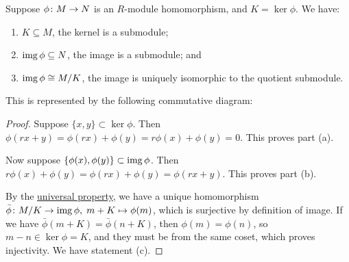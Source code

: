 \begin{theorem}\label{thm:iso-1-mod}
    Suppose \(\phi\colon M\to N\) is an \(R\)-module homomorphism,
    and \(K = \ker\phi\). We have:
    \begin{enumerate}[label={(\alph*)}, itemsep=0mm]
        \item \(K \subseteq M\), the kernel is a submodule;
        \item \(\operatorname{img}\phi \subseteq N\), the image is a submodule; and
        \item \(\operatorname{img}\phi \cong M/K\), the image is uniquely isomorphic to the quotient submodule.
    \end{enumerate}
    This is represented by the following commutative diagram:
    \begin{center}
    \end{center}
\end{theorem}
\begin{proof}
    Suppose \(\{x,y\} \subset \ker\phi\).
    Then \(\phi(rx+y) = \phi(rx) + \phi(y) = r\phi(x) + \phi(y) = 0\).
    This proves part (a).

    \medskip

    Now suppose \(\{\phi(x),\phi(y)\} \subset \operatorname{img}\phi\).
    Then \(r\phi(x)+\phi(y) = \phi(rx)+\phi(y) = \phi(rx+y)\).
    This proves part (b).

    \medskip

    By the \hyperref[thm:univ-prop-quotient-mod]{universal property},
    we have a unique homomorphism \(\bar{\phi}\colon M/K\to\operatorname{img}\phi,\;m+K\mapsto\phi(m)\),
    which is surjective by definition of image.
    If we have \(\bar{\phi}(m+K) = \bar{\phi}(n+K)\),
    then \(\phi(m) = \phi(n)\),
    so \(m-n \in \ker\phi = K\),
    and they must be from the same coset,
    which proves injectivity.
    We have statement (c).
\end{proof}

